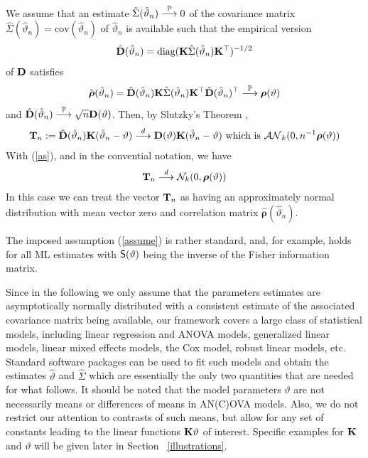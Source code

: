 \documentclass[12pt]{article}
\begin{document}
We assume that an estimate $\hat{\Sigma}(\hat{\vartheta}_n) \cP 0$ 
of the covariance matrix $\hat{\Sigma}(\hat{\vartheta}_n) =
\text{cov}(\hat{\vartheta}_n)$ of $\hat{\vartheta}_n$ is available such that
the empirical version
\begin{eqnarray*}
\hat{\D}(\hat{\vartheta}_n) = \text{diag}(\K \hat{\Sigma}(\hat{\vartheta}_n) \K^\top)^{-1/2}
\end{eqnarray*}
of $\D$ satisfies
\begin{eqnarray*}
\hat{\boldsymbol{\rho}}(\hat{\vartheta}_n) = \hat{\D}(\hat{\vartheta}_n) \K
\hat{\Sigma}(\hat{\vartheta}_n) \K^\top \hat{\D}(\hat{\vartheta}_n)^\top \cP 
\boldsymbol{\rho}(\vartheta)
\end{eqnarray*}
and $\hat{\D}(\hat{\vartheta}_n) \cP \sqrt{n} \D(\vartheta)$.
Then, by Slutzky's Theorem \citep[Theorem 1.5.4][]{Serfling1980}, 
\begin{eqnarray*}
\T_n := \hat{\D}(\hat{\vartheta}_n) \K (\hat{\vartheta}_n - \vartheta) \cL
\D(\vartheta) \K (\hat{\vartheta}_n - \vartheta) \text{ which is } \AN_k(0,
n^{-1} \boldsymbol{\rho}(\vartheta))
\end{eqnarray*}
With (\ref{as}), and in the convential notation, we have
\begin{eqnarray*}
\T_n \cL \N_k(0, \boldsymbol{\rho}(\vartheta))
\end{eqnarray*}
In this case we can treat the vector $\T_{n}$ as having an approximately
normal distribution with mean vector zero and correlation matrix  $%
\boldsymbol{\hat{\rho}}(\hat{\vartheta}_n)$.

The imposed assumption (\ref{assume}) is rather standard, and, for example,
holds for all ML estimates with $\S(\vartheta)$ being the inverse of the
Fisher information matrix.



Since in the following we only assume that the parameters estimates are
asymptotically normally distributed with a consistent estimate of the
associated covariance matrix being available, our framework covers a large
class of statistical models, including linear regression and ANOVA models,
generalized linear models, linear mixed effects models, the Cox model,
robust linear models, etc. Standard software packages can be used to fit
such models and obtain the estimates $\hat{\vartheta}$ and $\hat{\Sigma}$
which are essentially the only two quantities that are needed for what
follows. It should be noted that the model parameters $\vartheta $ are not
necessarily means or differences of means in AN(C)OVA models. Also, we do
not restrict our attention to contrasts of such means, but allow for any set
of constants leading to the linear functions $\K\vartheta $ of interest.
Specific examples for $\K$ and $\vartheta $ will be given later in Section~%
\ref{illustrations}.
\end{document}
